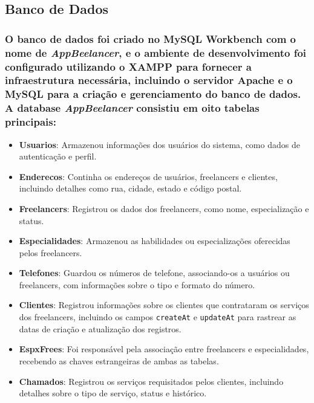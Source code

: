 \subsection{Banco de Dados}
\subsubsection{O banco de dados foi criado no \textbf{MySQL Workbench} com o nome de \textit{AppBeelancer}, e o ambiente de desenvolvimento foi configurado utilizando o \textbf{XAMPP} para fornecer a infraestrutura necessária, incluindo o servidor Apache e o MySQL para a criação e gerenciamento do banco de dados. A database \textit{AppBeelancer} consistiu em oito tabelas principais:}

\begin{itemize}
\item \textbf{Usuarios}: Armazenou informações dos usuários do sistema, como dados de autenticação e perfil.
\item \textbf{Enderecos}: Continha os endereços de usuários, freelancers e clientes, incluindo detalhes como rua, cidade, estado e código postal.
\item \textbf{Freelancers}: Registrou os dados dos freelancers, como nome, especialização e status.
\item \textbf{Especialidades}: Armazenou as habilidades ou especializações oferecidas pelos freelancers.
\item \textbf{Telefones}: Guardou os números de telefone, associando-os a usuários ou freelancers, com informações sobre o tipo e formato do número.
\item \textbf{Clientes}: Registrou informações sobre os clientes que contrataram os serviços dos freelancers, incluindo os campos \texttt{createAt} e \texttt{updateAt} para rastrear as datas de criação e atualização dos registros.
 \item \textbf{EspxFrees}: Foi responsável pela associação entre freelancers e especialidades, recebendo as chaves estrangeiras de ambas as tabelas.
\item \textbf{Chamados}: Registrou os serviços requisitados pelos clientes, incluindo detalhes sobre o tipo de serviço, status e histórico.
\end{itemize}